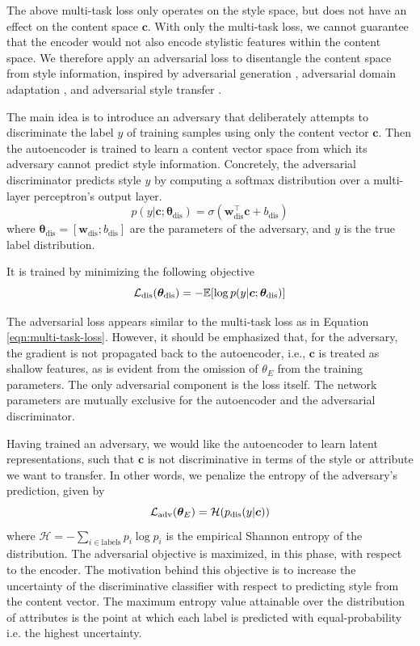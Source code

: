The above multi-task loss only operates on the style space, but does not have an effect on the content space $\bm c$. With only the multi-task loss, we cannot guarantee that the encoder would not also encode stylistic features within the content space. We therefore apply an adversarial loss to disentangle the content space from style information, inspired by adversarial generation \citep{goodfellow2014generative}, adversarial domain adaptation \citep{liu2017adversarial}, and adversarial style transfer \citep{fu2017style}.

The main idea is to introduce an adversary that deliberately attempts to discriminate the label $y$ of training samples using only the content vector $\bm c$. Then the autoencoder is trained to learn a content vector space from which its adversary cannot predict style information. Concretely, the adversarial discriminator predicts style $y$ by computing a softmax distribution over a multi-layer perceptron's output layer.
\begin{equation}
	p(y | \bm c; \bm\theta_\text{dis}) = \sigma(\bm w_\text{dis}^\top \bm c + b_\text{dis})
\end{equation}
where $\bm\theta_\text{dis}=[\bm w_\text{dis}; b_\text{dis}]$ are the parameters of the adversary, and $y$ is the true label distribution.

It is trained by minimizing the following objective
\begin{equation} \label{eqn:adv-disc-loss}
	\mathcal{L}_\text{dis}(\bm\theta_\text{dis}) =
	- \mathbb{E} [\log p(y | \bm c; \bm\theta_\text{dis})]
\end{equation}

The adversarial loss appears similar to the multi-task loss as in Equation \ref{eqn:multi-task-loss}. However, it should be emphasized that, for the adversary, the gradient is not propagated back to the autoencoder, i.e., $\bm c$ is treated as shallow features, as is evident from the omission of $\theta_{E}$ from the training parameters. The only adversarial component is the loss itself. The network parameters are mutually exclusive for the autoencoder and the adversarial discriminator.

Having trained an adversary, we would like the autoencoder to learn latent representations, such that $\bm c$ is not discriminative in terms of the style or attribute we want to transfer. In other words, we penalize the entropy of the adversary's prediction, given by
\begin{equation}
	\mathcal{L}_\text{adv}(\bm\theta_E) = \mathcal{H}(p_\text{dis}(y | \bm c))
\end{equation}
where $\mathcal{H}=-\sum_{i\in\text{labels}} p_i\log p_i$ is the empirical Shannon entropy of the distribution. The adversarial objective is maximized, in this phase, with respect to the encoder. The motivation behind this objective is to increase the uncertainty of the discriminative classifier with respect to predicting style from the content vector. The maximum entropy value attainable over the distribution of attributes is the point at which each label is predicted with equal-probability i.e. the highest uncertainty.


